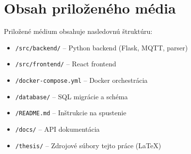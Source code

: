 \chapter{Obsah priloženého média}
\label{sec:AppendixMedia}

Priložené médium obsahuje nasledovnú štruktúru:

\begin{itemize}
    \item \texttt{/src/backend/} -- Python backend (Flask, MQTT, parser)
    \item \texttt{/src/frontend/} -- React frontend
    \item \texttt{/docker-compose.yml} -- Docker orchestrácia
    \item \texttt{/database/} -- SQL migrácie a schéma
    \item \texttt{/README.md} -- Inštrukcie na spustenie
    \item \texttt{/docs/} -- API dokumentácia
    \item \texttt{/thesis/} -- Zdrojové súbory tejto práce (LaTeX)
\end{itemize}

\endinput
